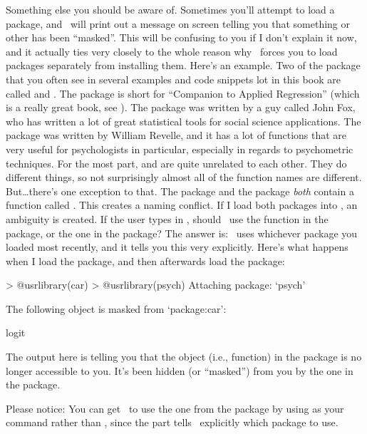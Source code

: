 Something else you should be aware of. Sometimes you'll attempt to load a package, and \R\ will print out a message on screen telling you that something or other has been ``masked''. This will be confusing to you if I don't explain it now, and it actually ties very closely to the whole reason why \R\ forces you to load packages separately from installing them. Here's an example. Two of the package that you often see in several examples and code snippets lot in this book are called  and . The  package is short for ``Companion to Applied Regression'' (which is a really great book, see \cite{Fox2011}). The  package was written by a guy called John Fox, who has written a lot of great statistical tools for social science applications. The  package was written by William Revelle, and it has a lot of functions that are very useful for psychologists in particular, especially in regards to psychometric techniques. For the most part,  and  are quite unrelated to each other. They do different things, so not surprisingly almost all of the function names are different. But\dots there's one exception to that. The  package and the  package {\it both} contain a function called . This creates a naming conflict. If I load both packages into \R, an ambiguity is created. If the user types in , should \R\ use the  function in the  package, or the one in the  package? The answer is: \R\ uses whichever package you loaded most recently, and it tells you this very explicitly. Here's what happens when I load the  package, and then afterwards load the  package: 
\begin{rblock1}
> @usr{library(car)}
> @usr{library(psych)}
Attaching package: `psych'

The following object is masked from `package:car':

    logit
\end{rblock1}
The output here is telling you that the  object (i.e., function) in the  package is no longer accessible to you. It's been hidden (or ``masked'') from you by the one in the  package.

Please notice: You can get \R\ to use the one from the  package by using  as your command rather than , since the  part tells \R\ explicitly which package to use. 

